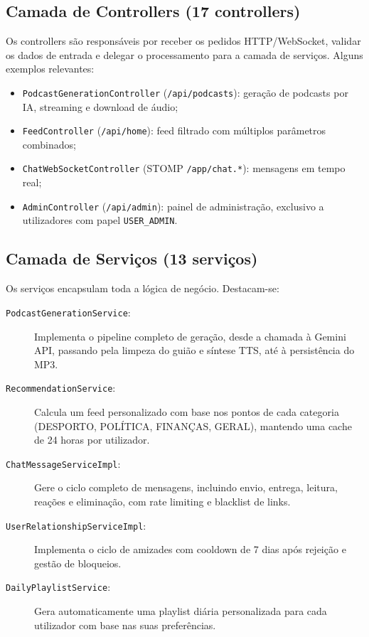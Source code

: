 \documentclass[12pt, a4paper]{report}
\begin{document}
\subsection{Camada de Controllers (17 controllers)}

Os controllers são responsáveis por receber os pedidos HTTP/WebSocket, validar
os dados de entrada e delegar o processamento para a camada de serviços. Alguns
exemplos relevantes:

\begin{itemize}
  \item \texttt{PodcastGenerationController} (\texttt{/api/podcasts}): geração de podcasts por IA, streaming e download de áudio;
  \item \texttt{FeedController} (\texttt{/api/home}): feed filtrado com múltiplos parâmetros combinados;
  \item \texttt{ChatWebSocketController} (STOMP \texttt{/app/chat.*}): mensagens em tempo real;
  \item \texttt{AdminController} (\texttt{/api/admin}): painel de administração, exclusivo a utilizadores com papel \texttt{USER\_ADMIN}.
\end{itemize}

\subsection{Camada de Serviços (13 serviços)}

Os serviços encapsulam toda a lógica de negócio. Destacam-se:

\begin{description}
  \item[\texttt{PodcastGenerationService}:] Implementa o pipeline completo de geração, desde a chamada à Gemini API, passando pela limpeza do guião e síntese TTS, até à persistência do MP3.
  \item[\texttt{RecommendationService}:] Calcula um feed personalizado com base nos pontos de cada categoria (DESPORTO, POLÍTICA, FINANÇAS, GERAL), mantendo uma cache de 24 horas por utilizador.
  \item[\texttt{ChatMessageServiceImpl}:] Gere o ciclo completo de mensagens, incluindo envio, entrega, leitura, reações e eliminação, com rate limiting e blacklist de links.
  \item[\texttt{UserRelationshipServiceImpl}:] Implementa o ciclo de amizades com cooldown de 7 dias após rejeição e gestão de bloqueios.
  \item[\texttt{DailyPlaylistService}:] Gera automaticamente uma playlist diária personalizada para cada utilizador com base nas suas preferências.
\end{description}
\end{document}
